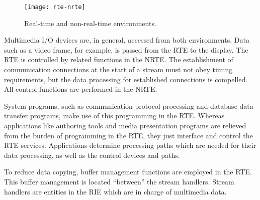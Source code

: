 \begin{figure}[ht!]
	\centering
	\texttt{[image: rte-nrte]}
	\caption{Real-time and non-real-time environments.}\label{fig:rte-nrte}
\end{figure}

Multimedia I/O devices are, in general, accessed from both environments. Data such as a video frame, for example, is passed from the RTE to the display. The RTE is controlled by related functions in the NRTE. The establishment of communication connections at the start of a stream must not obey timing requirements, but the data processing for established connections is compelled. All control functions are performed in the NRTE. 

System programs, such as communication protocol processing and database data transfer programs, make use of this programming in the RTE. Whereas applications like authoring tools and media presentation programs are relieved from the burden of programming in the RTE, they just interface and control the RTE services. Applications determine processing paths which are needed for their data processing, as well as the control devices and paths.

To reduce data copying, buffer management functions are employed in the RTE. This buffer management is located ``between'' the stream handlers. Stream handlers are
entities in the RIE which are in charge of multimedia data.

